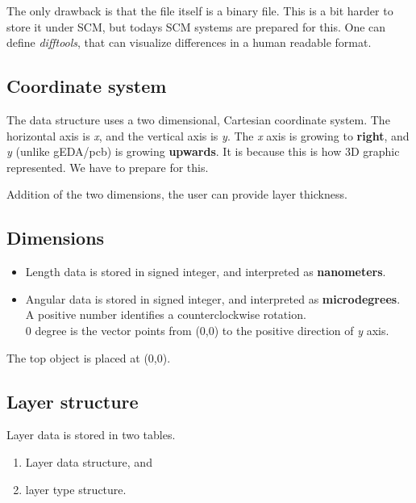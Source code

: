 \documentclass[12pt]{article}
\begin{document}
The only drawback is that the file itself is a binary file. This is a bit
harder to store it under SCM, but todays SCM systems are prepared for this.
One can define \textit{difftools}, that can visualize differences in a human
readable format.

\subsection{Coordinate system}\label{coordinate-system}

The data structure uses a two dimensional, Cartesian coordinate system.
The horizontal axis is \emph{x}, and the vertical axis is \emph{y}. The
\emph{x} axis is growing to \textbf{right}, and \emph{y} (unlike
gEDA/pcb) is growing \textbf{upwards}. It is because this is how 3D
graphic represented. We have to prepare for this.

Addition of the two dimensions, the user can provide layer thickness.

\subsection{Dimensions}\label{dimensions}

\begin{itemize}
\item
  Length data is stored in signed integer, and interpreted as
\textbf{nanometers}.
\item
  Angular data is stored in signed integer, and interpreted as
\textbf{microdegrees}.\\
  A positive number identifies a counterclockwise rotation.\\
  0 degree is the vector points from (0,0) to the positive direction of
\emph{y} axis.
\end{itemize}

The top object is placed at (0,0).

\subsection{Layer structure}\label{layer-structure}

Layer data is stored in two tables.

\begin{enumerate}
\item Layer data structure, and
\item layer type structure.
\end{enumerate}
\end{document}
